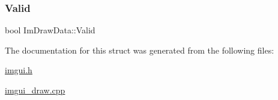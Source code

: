 \subsubsection{\texorpdfstring{Valid}{Valid}}
{\footnotesize\ttfamily bool Im\+Draw\+Data\+::\+Valid}



The documentation for this struct was generated from the following files\+:\begin{DoxyCompactItemize}
\item 
\mbox{\hyperlink{imgui_8h}{imgui.\+h}}\item 
\mbox{\hyperlink{imgui__draw_8cpp}{imgui\+\_\+draw.\+cpp}}\end{DoxyCompactItemize}
